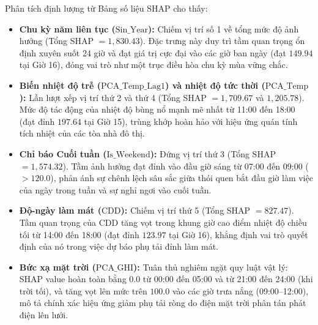 Phân tích định lượng từ Bảng số liệu SHAP cho thấy:
\begin{itemize}
    \item \textbf{Chu kỳ năm liên tục ($\text{Sin\_Year}$):} Chiếm vị trí số 1 về tổng mức độ ảnh hưởng (Tổng SHAP $= 1,830.43$). Đặc trưng này duy trì tầm quan trọng ổn định xuyên suốt 24 giờ và đạt giá trị cực đại vào các giờ ban ngày (đạt $149.94$ tại Giờ 16), đóng vai trò như một trục điều hòa chu kỳ mùa vững chắc.
    \item \textbf{Biến nhiệt độ trễ ($\text{PCA\_Temp\_Lag1}$) và nhiệt độ tức thời ($\text{PCA\_Temp}$):} Lần lượt xếp vị trí thứ 2 và thứ 4 (Tổng SHAP $= 1,709.67$ và $1,205.78$). Mức độ tác động của nhiệt độ bùng nổ mạnh mẽ nhất từ 11:00 đến 18:00 (đạt đỉnh $197.64$ tại Giờ 15), trùng khớp hoàn hảo với hiệu ứng quán tính tích nhiệt của các tòa nhà đô thị.
    \item \textbf{Chỉ báo Cuối tuần ($\text{Is\_Weekend}$):} Đứng vị trí thứ 3 (Tổng SHAP $= 1,574.32$). Tầm ảnh hưởng đạt đỉnh vào đầu giờ sáng từ 07:00 đến 09:00 ($>120.0$), phản ánh sự chênh lệch sâu sắc giữa thói quen bắt đầu giờ làm việc của ngày trong tuần và sự nghỉ ngơi vào cuối tuần.
    \item \textbf{Độ-ngày làm mát ($\text{CDD}$):} Chiếm vị trí thứ 5 (Tổng SHAP $= 827.47$). Tầm quan trọng của CDD tăng vọt trong khung giờ cao điểm nhiệt độ chiều tối từ 14:00 đến 18:00 (đạt đỉnh $123.97$ tại Giờ 16), khẳng định vai trò quyết định của nó trong việc dự báo phụ tải đỉnh làm mát.
    \item \textbf{Bức xạ mặt trời ($\text{PCA\_GHI}$):} Tuân thủ nghiêm ngặt quy luật vật lý: SHAP value hoàn toàn bằng $0.0$ từ 00:00 đến 05:00 và từ 21:00 đến 24:00 (khi trời tối), và tăng vọt lên mức trên $100.0$ vào các giờ trưa nắng (09:00--12:00), mô tả chính xác hiệu ứng giảm phụ tải ròng do điện mặt trời phân tán phát điện lên lưới.
\end{itemize}
